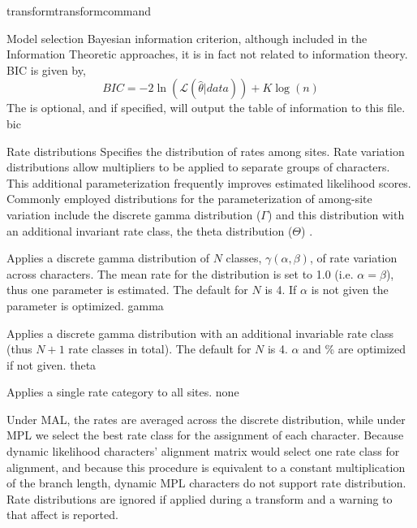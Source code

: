 \begin{command}{transform}{transformcommand}
\begin{arguments}
\begin {argumentgroup}{Model selection}
{ Bayesian information criterion, although included in
the Information Theoretic approaches, it is in fact not
related to information theory. BIC is given by,
\begin{equation*}
BIC = - 2 \ln(\mathcal{L}(\hat{\theta}|data)) + K \log(n)
\end{equation*}
The \poystring is optional, and if specified, 
\poy will output the table of information to this file.}
{bic}
\end{argumentgroup}


\begin{argumentgroup}{Rate distributions}
Specifies the distribution of rates among sites. Rate
variation distributions allow multipliers to be applied to
separate groups of characters. This additional parameterization
frequently improves estimated likelihood scores.
Commonly employed distributions for the parameterization of 
among-site variation include the discrete gamma distribution ($\Gamma$)
\cite{yang1994a} and this distribution with an additional
invariant rate class, the theta distribution ($\Theta$)
\cite{gu1995}. 


{Applies a discrete gamma distribution of $N$ classes,
$\gamma(\alpha,\beta)$, of rate variation across
characters. The mean rate for the distribution is set to
1.0 (i.e. $\alpha = \beta$), thus one parameter is
estimated. The default for $N$ is 4. If $\alpha$ is
not given the parameter is optimized.}
{gamma}

{Applies a discrete gamma distribution with an additional
invariable rate class (thus $N+1$ rate classes in total).
The default for $N$ is 4. $\alpha$ and \% are optimized if
not given.}
{theta}

{Applies a single rate category to all sites.}
{none}

\begin{statement}
Under MAL, the rates are averaged across the
discrete distribution, while under MPL we select the best
rate class for the assignment of each character. Because
dynamic likelihood characters' alignment matrix would select
one rate class for alignment, and because this procedure is equivalent to a
constant multiplication of the branch length, dynamic MPL
characters do not support rate distribution. Rate distributions are
ignored if applied during a transform and a
warning to that affect is reported.
\end{statement}


\end{argumentgroup}
\end{arguments}
\end{command}
